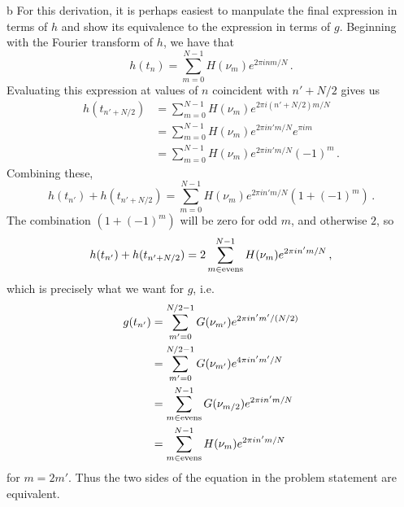 \documentclass[]{homework}
\begin{document}
\begin{problem}{1}
  \begin{subproblem}{b}
    For this derivation, it is perhaps easiest to manpulate the final
    expression in terms of $h$ and show its equivalence to the expression
    in terms of $g$. Beginning with the Fourier transform of $h$, we have
    that
    \[
      h(t_{n}) = \sum_{m = 0}^{N-1} H(\nu_{m}) e^{2\pi i n m / N}\,.
    \]
    Evaluating this expression at values of $n$ coincident with $n'+N/2$ gives us
    \begin{align}
      h(t_{n'+N/2}) & = \sum_{m = 0}^{N-1} H(\nu_{m}) e^{2\pi i (n'+N/2) m / N}\nonumber \\
                    & = \sum_{m = 0}^{N-1} H(\nu_{m}) e^{2\pi i n' m / N} e^{\pi i m}\nonumber \\
                    & = \sum_{m = 0}^{N-1} H(\nu_{m}) e^{2\pi i n' m / N} (-1)^m\,.\nonumber 
    \end{align}
    Combining these,
    \[
      h(t_{n'}) + h(t_{n'+N/2}) = \sum_{m = 0}^{N-1} H(\nu_{m}) e^{2\pi i n' m / N} (1 + (-1)^m)\,.
    \]
    The combination $(1 + (-1)^m)$ will be zero for odd $m$, and otherwise $2$, so
    \[
      h(t_{n'}) + h(t_{n'+N/2}) = 2 \sum_{m \in {\rm evens}}^{N-1} H(\nu_{m}) e^{2\pi i n' m / N}\,,
    \]
    which is precisely what we want for $g$, i.e.
    \begin{align}
      g(t_{n'}) &= \sum_{m' = 0}^{N/2-1} G(\nu_{m'}) e^{2\pi i n' m' / (N/2)}\nonumber \\
                &= \sum_{m' = 0}^{N/2-1} G(\nu_{m'}) e^{4\pi i n' m' / N}\nonumber \\
                &= \sum_{m \in {\rm evens}}^{N-1} G(\nu_{m/2}) e^{2\pi i n' m / N}\nonumber \\
                &= \sum_{m \in {\rm evens}}^{N-1} H(\nu_{m}) e^{2\pi i n' m / N}\nonumber
    \end{align}
    for $m = 2m'$. Thus the two sides of the equation in the problem statement are equivalent.
  \end{subproblem}

\end{problem}
\end{document}
